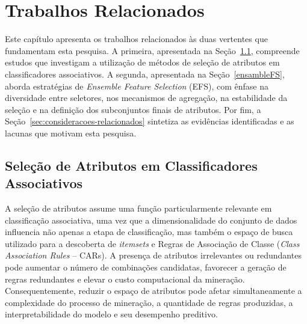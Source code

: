 
\chapter{Trabalhos Relacionados}
\label{trabRelac}

Este capítulo apresenta os trabalhos relacionados às duas vertentes que fundamentam esta pesquisa. A primeira, apresentada na Seção~\ref{sec:fs-ca}, compreende estudos que investigam a utilização de métodos de seleção de atributos em classificadores associativos. A segunda, apresentada na Seção~\ref{ensambleFS}, aborda estratégias de \textit{Ensemble Feature Selection} (EFS), com ênfase na diversidade entre seletores, nos mecanismos de agregação, na estabilidade da seleção e na definição dos subconjuntos finais de atributos. Por fim, a Seção~\ref{sec:consideracoes-relacionados} sintetiza as evidências identificadas e as lacunas que motivam esta pesquisa.

\section{Seleção de Atributos em Classificadores Associativos}
\label{sec:fs-ca}

A seleção de atributos assume uma função
particularmente relevante em classificação associativa, uma vez que a
dimensionalidade do conjunto de dados influencia não apenas a etapa de
classificação, mas também o espaço de busca utilizado para a descoberta de
\textit{itemsets} e Regras de Associação de Classe (\textit{Class Association
Rules} -- CARs). A presença de atributos irrelevantes ou redundantes pode
aumentar o número de combinações candidatas, favorecer a geração de regras
redundantes e elevar o custo computacional da mineração. Consequentemente,
reduzir o espaço de atributos pode afetar simultaneamente a complexidade do
processo de mineração, a quantidade de regras produzidas, a interpretabilidade
do modelo e seu desempenho preditivo.

